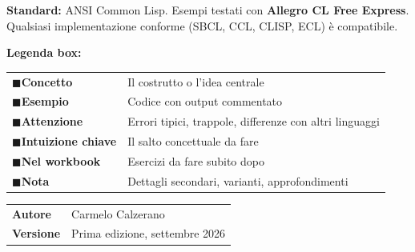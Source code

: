 \documentclass[a4paper,11pt,oneside]{book}
\begin{document}
\begin{tcolorbox}[
  enhanced,
  colback=black!3,
  colframe=black!30,
  boxrule=0.5pt,
  arc=3pt,
  left=12pt, right=12pt, top=10pt, bottom=10pt
]
\small
\textbf{Standard:} ANSI Common Lisp.
Esempi testati con \textbf{Allegro CL Free Express}.
Qualsiasi implementazione conforme (SBCL, CCL, CLISP, ECL) è compatibile.

\medskip
\textbf{Legenda box:}\\[4pt]
\begin{tabular}{@{}ll@{}}
\textcolor{csBlue}{$\blacksquare$}\enspace \textbf{Concetto} &
  Il costrutto o l'idea centrale\\[3pt]
\textcolor{csGreen}{$\blacksquare$}\enspace \textbf{Esempio} &
  Codice con output commentato\\[3pt]
\textcolor{csOrange}{$\blacksquare$}\enspace \textbf{Attenzione} &
  Errori tipici, trappole, differenze con altri linguaggi\\[3pt]
\textcolor{csTeal}{$\blacksquare$}\enspace \textbf{Intuizione chiave} &
  Il salto concettuale da fare\\[3pt]
\textcolor{csPurple}{$\blacksquare$}\enspace \textbf{Nel workbook} &
  Esercizi da fare subito dopo\\[3pt]
\textcolor{black!50}{$\blacksquare$}\enspace \textbf{Nota} &
  Dettagli secondari, varianti, approfondimenti\\
\end{tabular}
\end{tcolorbox}

\vspace{1.5em}

\noindent
\begin{tabular}{@{}ll@{}}
\textbf{Autore}   & Carmelo Calzerano\\[4pt]
\textbf{Versione} & Prima edizione, settembre 2026\\
\end{tabular}

\vspace{2em}
\end{document}
